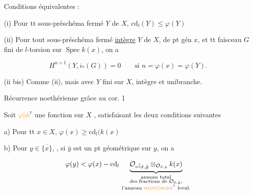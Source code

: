 Conditions équivalentes :

(i) Pour tt sous-préschéma fermé $Y$ de $X$, $\mathrm{cd}_l(Y)\leq\varphi(Y)$

(ii) Pour tout sous-préschéma fermé \uline{intègre} $Y$ de $X$, de pt gén $x$, et tt faisceau $G$ fini de $l$-torsion sur $\operatorname{Spec} k(x)$, on a

\[
H^{n+1}(Y,i_*(G))=0\qquad\text{si }n=\varphi(x)=\varphi(Y).
\]

(ii bis) Comme (ii), mais avec $Y$ fini sur $X$, intègre et unibranche.

Récurrence noethérienne grâce au cor. 1

 



  Soit $\unsure{\varphi|\phi}$ une fonction sur $X$ , satisfaisant les deux conditions suivantes

a) Pour tt $x\in X$, $\varphi(x)\geq\mathrm{cd}_l(k(x)$

b) Pour $y\in\overline{\{x\}}$, , si $\bar y$ est un pt géométrique sur $y$, on a

\[
\varphi(y)<\varphi(x)-\mathrm{cd}_l\,
\underbrace{\mathcal O_{\deleted{\unsure{x}}\bar x,\bar y}\otimes_{\mathcal O_{\bar x,y}}k(x)}_
{\substack{\text{anneau total}\\\text{des fractions de }\mathcal O_{\bar x,\bar y},\\\text{l'anneau }\text{\unsure{strictt|strict}}\ \text{local}.}}
\]


